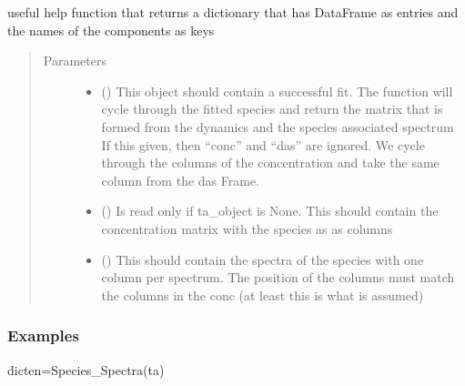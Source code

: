 \documentclass[letterpaper,10pt,english]{sphinxmanual}
\begin{document}
\begin{fulllineitems}
\label{\detokenize{plot_func:plot_func.Species_Spectra}}
useful help function that returns a dictionary that has DataFrame as entries and the names of the
components as keys
\begin{quote}\begin{description}
\item[{Parameters}] \leavevmode\begin{itemize}
\item {} 
 (\sphinxstyleliteralemphasis{\sphinxupquote{, }}) \textendash{} This object should contain a successful fit. The function will cycle through the fitted species
and return the matrix that is formed from the dynamics and the species associated spectrum
If this given, then “conc” and “das” are ignored. We cycle through the columns of the concentration
and take the same column from the das Frame.

\item {} 
 (\sphinxstyleliteralemphasis{\sphinxupquote{, }}) \textendash{} Is read only if ta\_object is None. This should contain the concentration matrix with the species as
as columns

\item {} 
 (\sphinxstyleliteralemphasis{\sphinxupquote{, }}) \textendash{} This should contain the spectra of the species with one column per spectrum. The position of the columns
must match the columns in the conc (at least this is what is assumed)

\end{itemize}

\end{description}\end{quote}
\subsubsection*{Examples}

dicten=Species\_Spectra(ta)

\end{fulllineitems}
\end{document}

